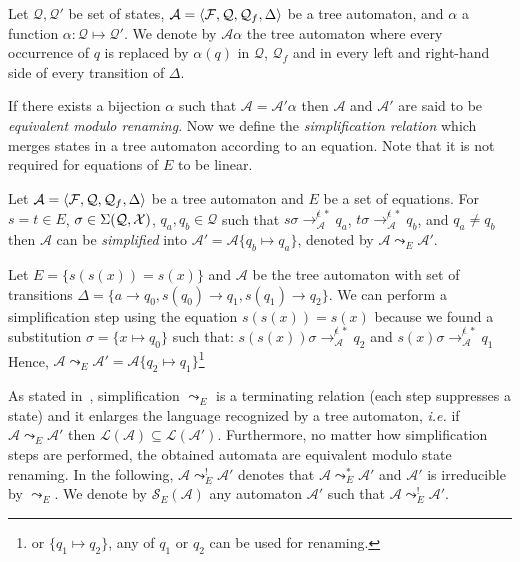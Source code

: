 \documentclass[a4paper,11pt]{llncs}
\newcommand{\A}{\mathcal{A}}
\newcommand{\Q}{\mathcal{Q}}
\newcommand{\Lang}{\mathcal{L}}
\newcommand{\F}{{\cal F}}
\newcommand{\X}{{\cal X}}
\newcommand{\rw}{\rightarrow}
\newcommand{\simp}{\leadsto}
\def\simpleq#1#2{\mathcal S_{#1}\left(#2\right)}
\newcommand{\rwAnestar}{\rightarrow^{\not\epsilon\: *}_{\A}}
\theoremstyle{plain}
\begin{document}
\label{sec:merging}
\begin{definition}
  Let $\Q,\Q'$ be set of states, $\A= \langle \F, \Q, \Q_f, \Delta \rangle$ be a
  tree automaton, and $\alpha$ a function $\alpha : \Q \mapsto \Q'$. We denote by
  $\A\alpha$ the tree automaton where every occurrence of $q$ is
  replaced by $\alpha(q)$ in $\Q$, $\Q_f$ and in every left and right-hand
  side of every transition of $\Delta$. 
\end{definition}
If there exists a bijection $\alpha$ such that $\A=\A'\alpha$ then $\A$ and
$\A'$ are said to be {\em equivalent modulo renaming}. 
Now we define the {\em simplification relation} which merges states in a tree
automaton according to an equation. Note that it is not required for equations
of $E$ to be linear.

\begin{definition}
\label{def:simprel}
  Let $\A= \langle \F, \Q, \Q_f, \Delta \rangle$ be a tree automaton and $E$ be
  a set of equations. For $s=t \in E$, $\sigma \in \Sigma(\Q, \X)$, $q_a,
  q_b \in \Q$ such that $s\sigma\rwAnestar q_a$, $t\sigma\rwAnestar q_b$, 
 and $q_a \neq q_b$ then $\A$ can be {\em simplified} into $\A'= \A\{q_b \mapsto
  q_a\}$, denoted by
$\A \simp_E \A'$.
\end{definition}

\begin{example}
  Let $E=\{s(s(x))=s(x)\}$ and $\A$ be the tree automaton with set of
  transitions $\Delta= \{ a \rw q_0, s(q_0) \rw q_1, s(q_1) 
  \rw q_2\}$. We can perform a simplification step using the equation
  $s(s(x))=s(x)$ because we found a substitution $\sigma=\{x
  \mapsto q_0\}$ such that: $s(s(x))\sigma \rwAnestar q_2$ and $s(x)\sigma\rwAnestar q_1$
  Hence, $\A \simp_E \A'= \A \{q_2 \mapsto q_1\}$\footnote{or $\{q_1 \mapsto q_2\}$,
any of $q_1$ or $q_2$ can be used for renaming.}
\end{example}


\noindent
As stated in~\cite{GenetR-JSC10}, simplification
$\simp_E$ is a terminating relation (each step suppresses a state) and it
enlarges the language recognized by a tree automaton, {\em i.e.} if $\A \simp_E \A'$
then $\Lang(\A) \subseteq \Lang(\A')$. Furthermore, no matter how
simplification steps are performed, the obtained automata are equivalent modulo
state renaming. In the following, $\A \simp_E^! \A'$ denotes that $\A \simp_E^*
\A'$ and $\A'$ is irreducible by $\simp_E$. We denote by $\simpleq E\A$ any automaton $\A'$ such that $\A
\simp_E^! \A'$. 
\end{document}

